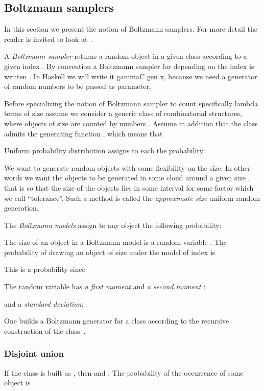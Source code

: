 \documentclass{sig-alternate}
\begin{document}
\begin{figure*}[!t]
\section{Boltzmann samplers}
\label{sec:Boltzmann}

In this section we present the notion of Boltzmann samplers. For more detail the
reader is invited to look at~\cite{DBLP:journals/cpc/DuchonFLS04}.

A \emph{Boltzmann sampler} returns a random object in a given class  according to
a given index .  By convention a Boltzmann sampler for  depending on the index
 is written .  In \textsf{Haskell} we will write it \<gammaC gen x\>, because
we need a generator of random numbers to be passed as parameter.

Before specializing the notion of Boltzmann sampler to count specifically lambda
terms of size  assume we consider a generic class  of combinatorial
structures, where objects of size  are counted by numbers .  Assume in
addition that the  class  admits the generating function , which means that

Uniform probability distribution assigns to each  the probability:

We want to generate random objects with some flexibility on the size. In other words
we want the objects to be generated in some cloud around a given size , that is so
that the size  of the objects lies in some interval  for some factor  which we call ``tolerance''. Such a
method is called the \emph{approximate-size} uniform random generation.

The \textit{Boltzmann models} assign to any object  the following
probability:


The size of an object in a Boltzmann model is a random variable .  The probability
of drawing an object of size  under the model of index  is

This is a probability since


The random variable  has \emph{a first moment} and \emph{a second moment}
\cite{DBLP:journals/cpc/DuchonFLS04}:


and a \emph{standard deviation}:

One builds a Boltzmann generator for a class  according to the recursive
construction of the class~.

\subsubsection*{Disjoint union}

If the class is built as , then  and
.  The probability of the occurrence of some object is


\end{figure*}
\end{document}
